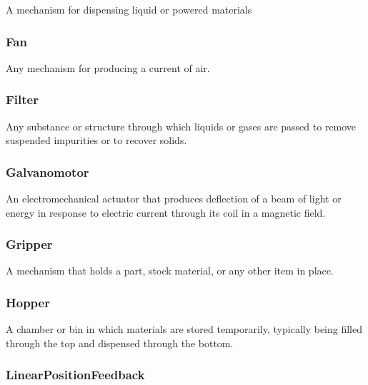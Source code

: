 A mechanism for dispensing liquid or powered materials

\FloatBarrier

\subsubsection{Fan}
\label{sec:Fan}



Any mechanism for producing a current of air.

\FloatBarrier

\subsubsection{Filter}
\label{sec:Filter}



Any substance or structure through which liquids or gases are passed to remove suspended impurities or to recover solids.

\FloatBarrier

\subsubsection{Galvanomotor}
\label{sec:Galvanomotor}



An electromechanical actuator that produces deflection of a beam of light or energy in response to electric current through its coil in a magnetic field.

\FloatBarrier

\subsubsection{Gripper}
\label{sec:Gripper}



A mechanism that holds a part, stock material, or any other item in place.

\FloatBarrier

\subsubsection{Hopper}
\label{sec:Hopper}



A chamber or bin in which materials are stored temporarily, typically being filled through the top and dispensed through the bottom.

\FloatBarrier

\subsubsection{LinearPositionFeedback}
\label{sec:LinearPositionFeedback}



